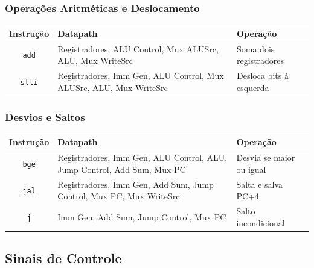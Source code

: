 \documentclass[12pt,a4paper,titlepage]{article}
\begin{document}
\subsubsection{Operações Aritméticas e Deslocamento}
\begin{table}[h]
    \small
    \centering
    \begin{tabularx}{\linewidth}{|c|>{\raggedright\arraybackslash}X|>{\raggedright\arraybackslash}X|}
        \hline
        \textbf{Instrução} & \textbf{Datapath} & \textbf{Operação} \\ \hline\hline
        \texttt{add} & Registradores, ALU Control, Mux ALUSrc, ALU, Mux WriteSrc & Soma dois registradores \\ \hline
        \texttt{slli} & Registradores, Imm Gen, ALU Control, Mux ALUSrc, ALU, Mux WriteSrc & Desloca bits à esquerda \\ \hline
    \end{tabularx}
\end{table}

\clearpage\subsubsection{Desvios e Saltos}
\begin{table}[h]
    \small
    \centering
    \begin{tabularx}{\linewidth}{|c|>{\raggedright\arraybackslash}X|>{\raggedright\arraybackslash}X|}
        \hline
        \textbf{Instrução} & \textbf{Datapath} & \textbf{Operação} \\ \hline\hline
        \texttt{bge} & Registradores, Imm Gen, ALU Control, ALU, Jump Control, Add Sum, Mux PC & Desvia se maior ou igual \\ \hline
        \texttt{jal} & Registradores, Imm Gen, Add Sum, Jump Control, Mux PC, Mux WriteSrc & Salta e salva PC+4 \\ \hline
        \texttt{j} & Imm Gen, Add Sum, Jump Control, Mux PC & Salto incondicional \\ \hline
    \end{tabularx}
\end{table}

\clearpage\subsection{Sinais de Controle}
\end{document}
